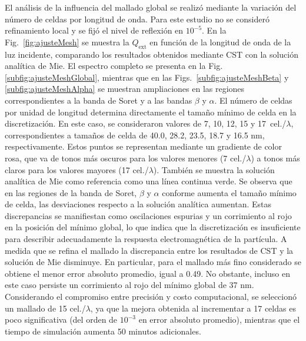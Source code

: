 El análisis de la influencia del mallado global se realizó mediante la variación del número de celdas por longitud de onda. Para este estudio no se consideró refinamiento local y se fijó el nivel de reflexión en $10^{-5}$. En la Fig.~\ref{fig:ajusteMesh} se muestra la $Q_{\text{ext}}$ en función de la longitud de onda de la luz incidente, comparando los resultados obtenidos mediante CST con la solución analítica de Mie. El espectro completo se presenta en la Fig. \ref{subfig:ajusteMeshGlobal}, mientras que en las Figs.~\ref{subfig:ajusteMeshBeta} y \ref{subfig:ajusteMeshAlpha} se muestran ampliaciones en las regiones correspondientes a la banda de Soret y a las bandas $\beta$ y $\alpha$. El número de celdas por unidad de longitud determina directamente el tamaño mínimo de celda en la discretización. En este caso, se consideraron valores de 7, 10, 12, 15 y 17~cel./$\lambda$, correspondientes a tamaños de celda de 40.0, 28.2, 23.5, 18.7 y 16.5 nm, respectivamente. Estos puntos se representan mediante un gradiente de color rosa, que va de tonos más oscuros para los valores menores (7 cel./$\lambda$) a tonos más claros para los valores mayores (17 cel./$\lambda$).  También se muestra la solución analítica de Mie como referencia como una línea continua verde. Se observa que en las regiones de la banda de Soret, $\beta$ y $\alpha$ conforme aumenta el tamaño mínimo de celda, las desviaciones respecto a la solución analítica aumentan. Estas discrepancias se manifiestan como oscilaciones espurias y un corrimiento al rojo en la posición del mínimo global, lo que indica que la discretización es insuficiente para describir adecuadamente la respuesta electromagnética de la partícula. A medida que se refina el mallado la discrepancia entre los resultados de CST y la solución de Mie disminuye. En particular, para el mallado más fino considerado se obtiene el menor error absoluto promedio, igual a 0.49. No obstante, incluso en este caso persiste un corrimiento al rojo del mínimo global de 37 nm. Considerando el compromiso entre precisión y costo computacional, se seleccionó un mallado de 15 cel./$\lambda$, ya que la mejora obtenida al incrementar a 17 celdas es poco significativa (del orden de $10^{-3}$ en error absoluto promedio), mientras que el tiempo de simulación aumenta 50 minutos adicionales.
%
